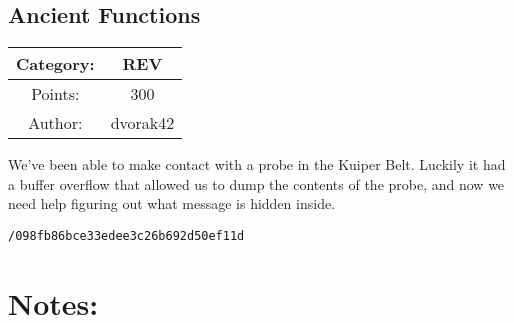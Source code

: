 \begin{center}
\section*{Ancient Functions}
{\large
\begin{tabular}{| c c |}
\hline
Category: & REV\\\hline
Points: & 300\\\hline
Author: & dvorak42\\\hline
\end{tabular}
}
\end{center}
\vspace{0.5in}

{\large
We've been able to make contact with a probe in the Kuiper Belt. Luckily it had a buffer overflow that allowed us to dump the contents of the probe, and now we need help figuring out what message is hidden inside.
}
\vspace{0.25in}
\begin{center}
  {\Large\tt /098fb86bce33edee3c26b692d50ef11d}
\end{center}

\vspace{0.25in}
\section*{Notes:}
